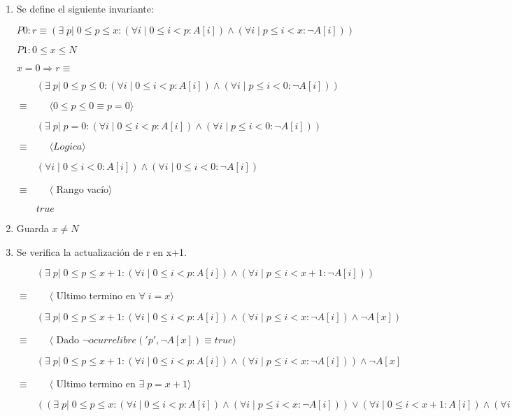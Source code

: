 \documentclass[hidelinks]{article}
\begin{document}
\begin{enumerate}
	\item Se define el siguiente invariante: \par
	      $P0: r \equiv (\exists \; p| \; 0 \leq p \leq x : (\forall i \;|\; 0 \leq i < p:A[i]) \land (\forall i \;|\; p \leq i < x: \neg A[i]))$ \par
	      $P1: 0 \leq x \leq N$ \par
	      $x = 0 \Rightarrow r \equiv $ \par
	      $\qquad (\exists \; p| \; 0 \leq p \leq 0 : (\forall i \;|\; 0 \leq i < p:A[i]) \land (\forall i \;|\; p \leq i < 0: \neg A[i]))$ \par
	      $\equiv  \qquad \langle 0 \leq p \leq 0 \equiv p = 0 \rangle$ \par
	      $\qquad (\exists \; p| \; p=0 : (\forall i \;|\; 0 \leq i < p:A[i]) \land (\forall i \;|\; p \leq i < 0: \neg A[i]))$ \par
	      $\equiv  \qquad \langle Logica \rangle$ \par
	      $\qquad (\forall i \;|\; 0 \leq i < 0:A[i]) \land (\forall i \;|\; 0 \leq i < 0: \neg A[i])$ \par
	      $\equiv  \qquad \langle $ Rango vacío$ \rangle$ \par
	      $\qquad true$ \par
	\item Guarda $x \neq N$
	\item Se verifica la actualización de r en x+1. \par
	      $\qquad (\exists \; p| \; 0 \leq p \leq x+1 : (\forall i \;|\; 0 \leq i < p:A[i]) \land (\forall i \;|\; p \leq i < x+1: \neg A[i]))$ \par
	      $\equiv  \qquad \langle$ Ultimo termino en  $\forall \; i=x \rangle$ \par
	      $\qquad (\exists \; p| \; 0 \leq p \leq x+1 : (\forall i \;|\; 0 \leq i < p:A[i]) \land (\forall i \;|\; p \leq i < x: \neg A[i]) \land \neg A[x])$ \par
	      $\equiv  \qquad \langle$ Dado  $\neg ocurrelibre('p',\neg A[x]) \equiv true \rangle$ \par
	      $\qquad (\exists \; p| \; 0 \leq p \leq x+1 : (\forall i \;|\; 0 \leq i < p:A[i]) \land (\forall i \;|\; p \leq i < x: \neg A[i])) \land \neg A[x]$ \par
	      $\equiv  \qquad \langle$ Ultimo termino en  $\exists \; p=x+1 \rangle$ \par
	      $\qquad ((\exists \; p| \; 0 \leq p \leq x : (\forall i \;|\; 0 \leq i < p:A[i]) \land (\forall i \;|\; p \leq i < x: \neg A[i])) \lor (\forall i \;|\; 0 \leq i < x+1:A[i]) \land (\forall i \;|\; x+1 \leq i < x: \neg A[i])) \land \neg A[x]$ \par

\end{enumerate}
\end{document}
